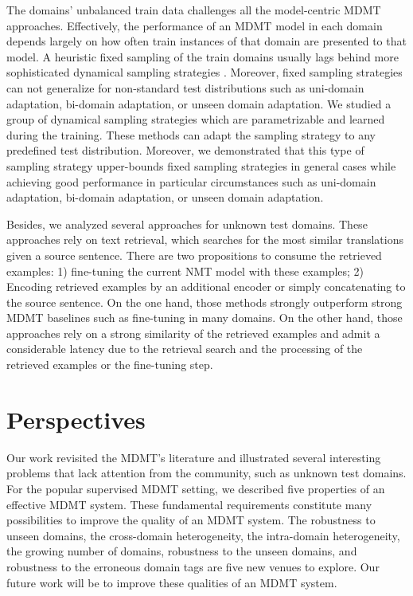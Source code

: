 The domains' unbalanced train data challenges all the model-centric MDMT approaches. Effectively, the performance of an MDMT model in each domain depends largely on how often train instances of that domain are presented to that model. A heuristic fixed sampling of the train domains usually lags behind more sophisticated dynamical sampling strategies \citep{Wang20balancing}. Moreover, fixed sampling strategies can not generalize for non-standard test distributions such as uni-domain adaptation, bi-domain adaptation, or unseen domain adaptation. We studied a group of dynamical sampling strategies which are parametrizable and learned during the training. These methods can adapt the sampling strategy to any predefined test distribution. Moreover, we demonstrated that this type of sampling strategy upper-bounds fixed sampling strategies in general cases while achieving good performance in particular circumstances such as uni-domain adaptation, bi-domain adaptation, or unseen domain adaptation.

Besides, we analyzed several approaches for unknown test domains. These approaches rely on text retrieval, which searches for the most similar translations given a source sentence. There are two propositions to consume the retrieved examples: 1) fine-tuning the current NMT model with these examples; 2) Encoding retrieved examples by an additional encoder or simply concatenating to the source sentence. On the one hand, those methods strongly outperform strong MDMT baselines such as fine-tuning in many domains. On the other hand, those approaches rely on a strong similarity of the retrieved examples and admit a considerable latency due to the retrieval search and the processing of the retrieved examples or the fine-tuning step.

\section{Perspectives}

Our work revisited the MDMT's literature and illustrated several interesting problems that lack attention from the community, such as unknown test domains. For the popular supervised MDMT setting, we described five properties of an effective MDMT system. These fundamental requirements constitute many possibilities to improve the quality of an MDMT system. The robustness to unseen domains, the cross-domain heterogeneity, the intra-domain heterogeneity, the growing number of domains, robustness to the unseen domains, and robustness to the erroneous domain tags are five new venues to explore. Our future work will be to improve these qualities of an MDMT system.

